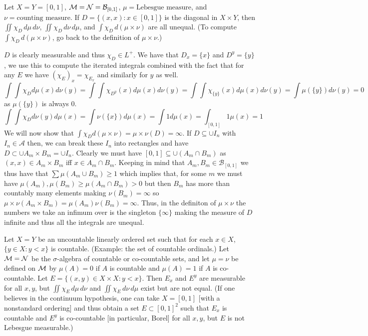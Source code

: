 \documentclass[12pt,a4paper]{article}
\begin{document}
\begin{problem}\label{prob:2-46}
Let $X = Y = [0, 1]$, $\mathcal{M} = \mathcal{N} = \mathcal{B}_{[0, 1]}$, $\mu = \text{Lebesgue measure}$, and $\nu = \text{counting measure}$. If $D = \{(x, x) : x \in [0, 1]\}$ is the diagonal in $X \times Y$, then $\iint \chi_D \, d\mu \, d\nu$, $\iint \chi_D \, d\nu \, d\mu$, and $\int \chi_D \, d(\mu \times \nu)$ are all unequal. (To compute $\int \chi_D \, d(\mu \times \nu)$, go back to the definition of $\mu \times \nu$.)
\end{problem}
\begin{solution}
	$D$ is clearly measurable and thus $\chi_D\in L^+$.
	We have that $D_x=\{x\}$ and $D^y=\{y\}$, we use this to compute the iterated integrals combined with the fact that for any $E$ we have $(\chi_E)_x=\chi_{E_x}$ and similarly for $y$ as well.
	\[
		\int\int\chi_Dd\mu(x)d\nu(y)=\int\int\chi_{D^y}(x)d\mu(x)d\nu(y)=\int\int\chi_{\{y\}}(x)d\mu(x)d\nu(y)=\int\mu(\{y\})d\nu(y)=0
	\]
	as $\mu(\{y\})$ is always $0$. 
	\[
		\int\int\chi_Dd\nu(y)d\mu(x)=\int\nu(\{x\})d\mu(x)=\int 1d\mu(x)=\int_{[0,1]}1\mu(x)=1
	\]
	We will now show that $\int\chi_Dd(\mu\times\nu)=\mu\times\nu(D)=\infty$. 
	If $D\subseteq\cup I_n$ with $I_n\in\mathcal A$ then, we can break these $I_n$ into rectangles and have $D\subset \cup A_m\times B_m=\cup I_n$. 
	Clearly we must have $[0,1]\subseteq \cup(A_m\cap B_m)$ as $(x,x)\in A_m\times B_m$ iff $x\in A_m\cap B_m$.
	Keeping in mind that $A_m,B_m\in\mathcal B_{[0,1]}$ we thus have that $\sum\mu(A_m\cup B_m)\geq 1$ which implies that, for some $m$ we must have $\mu(A_m),\mu(B_m)\geq\mu(A_m\cap B_m)>0$ but then $B_m$ has more than countably many elements making $\nu(B_m)=\infty$ so $\mu\times\nu(A_m\times B_m)=\mu(A_m)\nu(B_m)=\infty$. 
	Thus, in the definiton of $\mu\times\nu$ the numbers we take an infimum over is the singleton $\{\infty\}$ making the measure of $D$ infinite and thus all the integrals are unequal.
\end{solution}
\begin{problem}\label{prob:2-47}
Let $X = Y$ be an uncountable linearly ordered set such that for each $x \in X$, $\{y \in X : y < x\}$ is countable. (Example: the set of countable ordinals.) Let $\mathcal{M} = \mathcal{N}$ be the $\sigma$-algebra of countable or co-countable sets, and let $\mu = \nu$ be defined on $\mathcal{M}$ by $\mu(A) = 0$ if $A$ is countable and $\mu(A) = 1$ if $A$ is co-countable. Let $E = \{(x, y) \in X \times X : y < x\}$. Then $E_x$ and $E^y$ are measurable for all $x, y$, but $\iint \chi_E \, d\mu \, d\nu$ and $\iint \chi_E \, d\nu \, d\mu$ exist but are not equal. (If one believes in the continuum hypothesis, one can take $X = [0, 1]$ [with a nonstandard ordering] and thus obtain a set $E \subset [0, 1]^2$ such that $E_x$ is countable and $E^y$ is co-countable [in particular, Borel] for all $x, y$, but $E$ is not Lebesgue measurable.)
\end{problem}
\end{document}
